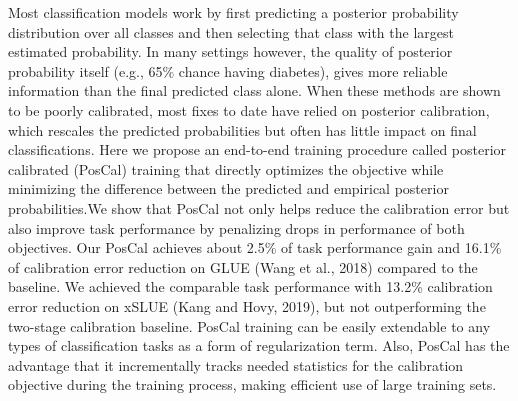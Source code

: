 Most classification models work by first predicting a posterior probability distribution over all classes and then selecting that class with the largest estimated probability. In many settings however, the quality of posterior probability itself (e.g., 65\% chance having diabetes), gives more reliable information than the final predicted class alone. When these methods are shown to be poorly calibrated, most fixes to date have relied on posterior calibration, which rescales the predicted probabilities but often has little impact on final classifications. Here we propose an end-to-end training procedure called posterior calibrated (PosCal) training that directly optimizes the objective while minimizing the difference between the predicted and empirical posterior probabilities.We show that PosCal not only helps reduce the calibration error but also improve task performance by penalizing drops in performance of both objectives. Our PosCal achieves about 2.5\% of task performance gain and 16.1\% of calibration error reduction on GLUE (Wang et al., 2018) compared to the baseline. We achieved the comparable task performance with 13.2\% calibration error reduction on xSLUE (Kang and Hovy, 2019), but not outperforming the two-stage calibration baseline. PosCal training can be easily extendable to any types of classification tasks as a form of regularization term. Also, PosCal has the advantage that it incrementally tracks needed statistics for the calibration objective during the training process, making efficient use of large training sets.
